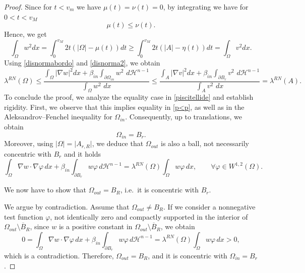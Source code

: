 \documentclass[oneside,a4paper,11pt,notitlepage]{article}
\newcommand{\abs}[1]{{\left|#1\right|}}
\theoremstyle{plain}
\numberwithin{teor}{section}
\numberwithin{equation}{section}
\theoremstyle{definition}
\theoremstyle{plain}
\theoremstyle{plain}
\theoremstyle{plain}
\theoremstyle{plain}
\theoremstyle{definition}
\theoremstyle{definition}
\theoremstyle{plain}
\begin{document}
\begin{proof}
Since for $t<v_m$ we have $\mu(t)=\nu(t)=0$, by integrating we have for $0 < t <v_M$
$$\mu(t) \leq \nu(t).$$
 Hence, we get
    \begin{equation}
    \label{disnorma2}
    \displaystyle \int_\Omega w^2 dx= \int_0^{v_M} 2t(|\Omega|-\mu(t))dt\ge\int_0^{v_M} 2t(|A|-\eta(t))dt=\int_\Omega v^2dx.
    \end{equation}
    Using \eqref{disnormabordo} and \eqref{disnorma2}, we obtain
    \begin{equation}
    \label{a24}
    \lambda^{RN}(\Omega)\le \frac{\displaystyle \int_\Omega \abs{\nabla w}^2 dx +\beta_{in}\int_{\partial \Omega_{in}}w^2 \,\,d\mathcal{H}^{n-1}}{\displaystyle \int_{\Omega}w^2 \,\,dx}\le \frac{\displaystyle \int_A \abs{\nabla v}^2 dx +\beta_{in}\int_{\partial B_r}v^2 \,\,d\mathcal{H}^{n-1}}{\displaystyle \int_{A}v^2 \,\,dx}= \lambda^{RN}(A).
    \end{equation}
    To conclude the proof, we analyze the equality case in \eqref{piscitellide} and establish rigidity. 
First, we observe that this implies equality in \eqref{p<p}, as well as in the Aleksandrov--Fenchel inequality for $\Omega_{in}$. Consequently, up to translations, we obtain
\[
\Omega_{in} = B_{r}.
\]
Moreover, using $\lvert \Omega \rvert = \lvert A_{r,R} \rvert$, we deduce that $\Omega_{out}$ is also a ball, not necessarily concentric with $B_r$ and it holds
\begin{equation}
\label{weakrn2}
\int_{\Omega} \nabla w \cdot \nabla \varphi \, dx 
+ \beta_{in} \int_{\partial B_r} w \varphi \, d\mathcal{H}^{n-1}
= \lambda^{RN}(\Omega) \int_{\Omega} w \varphi \, dx,
\qquad \forall \varphi \in W^{1,2}(\Omega).
\end{equation}

We now have to show that $\Omega_{out} = B_R$, i.e.\ it is concentric with $B_r$.



We argue by contradiction. Assume that $\Omega_{out} \neq B_R$. If we consider  a nonnegative test function $\varphi$, not identically zero and compactly supported in the interior of $\Omega_{out} \setminus \overline{B}_R$, since $w$ is a positive constant in $\Omega_{out} \setminus \overline{B}_R$, we obtain
\begin{equation}
0 = \int_{\Omega} \nabla w \cdot \nabla \varphi \, dx 
+ \beta_{in} \int_{\partial B_r} w \varphi \, d\mathcal{H}^{n-1}
= \lambda^{RN}(\Omega) \int_{\Omega} w \varphi \, dx > 0,
\end{equation}
which is a contradiction.
Therefore, $\Omega_{out} = B_R$, and it is concentric with $\Omega_{in} = B_r$.

\end{proof}
\end{document}
